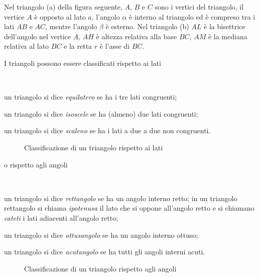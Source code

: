 Nel triangolo (a) della figura seguente, $A$, $B$ e $C$ sono i vertici del triangolo, il vertice $A$ è opposto al lato $a$, l'angolo $\alpha$ è interno al triangolo ed è compreso tra i lati $AB$ e $AC$, mentre l'angolo $\beta$ è esterno. Nel triangolo (b) $AL$ è la bisettrice dell'angolo nel vertice $A$, $AH$ è altezza relativa alla base $BC$, $AM$ è la mediana relativa al lato $BC$ e la retta $r$ è l'asse di $BC$.

\begin{figure}[htb]
\centering
\end{figure}

I triangoli possono essere classificati rispetto ai lati
\begin{definizione}~
\begin{itemize*}
\item un triangolo si dice \emph{equilatero} se ha i tre lati congruenti;
\item un triangolo si dice \emph{isoscele} se ha (almeno) due lati congruenti;
\item un triangolo si dice \emph{scaleno} se ha i lati a due a due non congruenti.
\end{itemize*}
\end{definizione}

\begin{figure}[htb]
\centering
\caption{Classificazione di un triangolo rispetto ai lati}\label{fig:class_triangolo_lati}
\end{figure}

\noindent o rispetto agli angoli
\begin{definizione}~
\begin{itemize*}
\item un triangolo si dice \emph{rettangolo} se ha un angolo interno retto; in un triangolo rettangolo si chiama \emph{ipotenusa} il lato che si oppone all'angolo retto e si chiamano \emph{cateti} i lati adiacenti all'angolo retto;
\item un triangolo si dice \emph{ottusangolo} se ha un angolo interno ottuso;
\item un triangolo si dice \emph{acutangolo} se ha tutti gli angoli interni acuti.
\end{itemize*}
\end{definizione}

\begin{figure}[htb]
\centering
\caption{Classificazione di un triangolo rispetto agli angoli}\label{fig:class_triangolo_angoli}
\end{figure}

